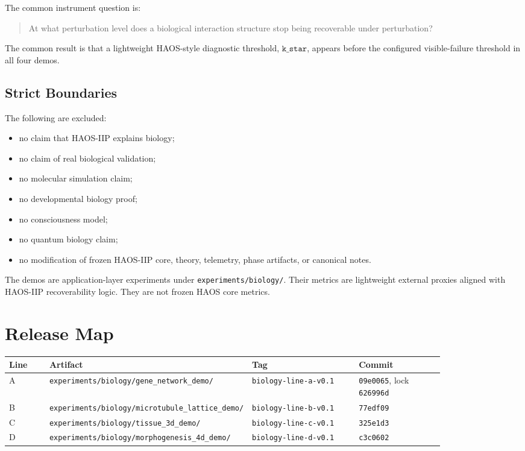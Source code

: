 \documentclass[11pt]{article}
\begin{document}
The common instrument question is:

\begin{quote}
At what perturbation level does a biological interaction structure stop being recoverable under perturbation?
\end{quote}

The common result is that a lightweight HAOS-style diagnostic threshold, \(\texttt{k\_star}\), appears before the configured visible-failure threshold in all four demos.

\subsection{Strict Boundaries}

The following are excluded:

\begin{itemize}
\item no claim that HAOS-IIP explains biology;
\item no claim of real biological validation;
\item no molecular simulation claim;
\item no developmental biology proof;
\item no consciousness model;
\item no quantum biology claim;
\item no modification of frozen HAOS-IIP core, theory, telemetry, phase artifacts, or canonical notes.
\end{itemize}

The demos are application-layer experiments under \texttt{experiments/biology/}. Their metrics are lightweight external proxies aligned with HAOS-IIP recoverability logic. They are not frozen HAOS core metrics.

\section{Release Map}

\begin{longtable}{p{0.10\linewidth}p{0.24\linewidth}p{0.28\linewidth}p{0.22\linewidth}}
\toprule
Line & Artifact & Tag & Commit \\
\midrule
A & \texttt{experiments/biology/gene\_network\_demo/} & \texttt{biology-line-a-v0.1} & \texttt{09e0065}, lock \texttt{626996d} \\
B & \texttt{experiments/biology/microtubule\_lattice\_demo/} & \texttt{biology-line-b-v0.1} & \texttt{77edf09} \\
C & \texttt{experiments/biology/tissue\_3d\_demo/} & \texttt{biology-line-c-v0.1} & \texttt{325e1d3} \\
D & \texttt{experiments/biology/morphogenesis\_4d\_demo/} & \texttt{biology-line-d-v0.1} & \texttt{c3c0602} \\
\bottomrule
\end{longtable}
\end{document}

